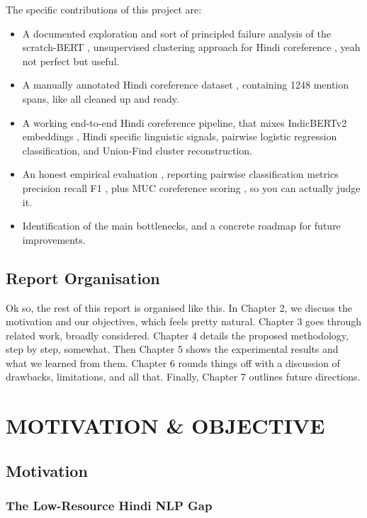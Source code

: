\documentclass[12pt,a4paper]{report}
\begin{document}
The specific contributions of this project are:

\begin{itemize}
\item A documented exploration  and sort of principled failure analysis of the scratch-BERT , unsupervised clustering approach for Hindi coreference ,  yeah not perfect but useful.
    \item A manually annotated Hindi coreference dataset , containing 1248 mention spans, like all cleaned up and ready.
    \item A working end-to-end Hindi coreference pipeline, that mixes IndicBERTv2 embeddings , Hindi specific linguistic signals, pairwise logistic regression classification, and Union-Find cluster reconstruction.  
    \item An honest empirical evaluation , reporting pairwise classification metrics precision recall F1 , plus MUC coreference scoring , so you can actually judge it.
    \item Identification of the main bottlenecks, and a concrete roadmap for future improvements.
\end{itemize}

\section{Report Organisation}

Ok so, the rest of this report is organised like this. In Chapter 2, we discuss the motivation and our objectives,  which feels pretty natural. Chapter 3 goes through related work, broadly considered. Chapter 4 details the proposed methodology, step by step, somewhat. Then Chapter 5 shows the experimental results and what we learned from them. Chapter 6 rounds things off with a discussion of drawbacks, limitations, and all that. Finally, Chapter 7 outlines future directions.


\chapter{MOTIVATION \& OBJECTIVE}

\section{Motivation}

\subsection{The Low-Resource Hindi NLP Gap}
\end{document}

